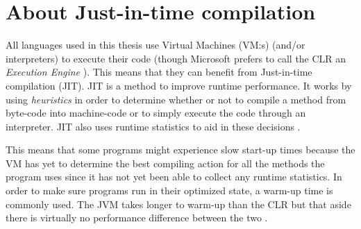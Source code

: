 \section{About Just-in-time compilation} \label{sec:jit}
All languages used in this thesis use Virtual Machines (VM:s) (and/or interpreters) to execute their code (though Microsoft prefers to call the CLR an \textit{Execution Engine} \cite{ExecutionEngine}). This means that they can benefit from Just-in-time compilation (JIT). JIT is a method to improve runtime performance. It works by using \textit{heuristics} in order to determine whether or not to compile a method from byte-code into machine-code or to simply execute the code through an interpreter. JIT also uses runtime statistics to aid in these decisions \cite{Jit}.

This means that some programs might experience slow start-up times because the VM has yet to determine the best compiling action for all the methods the program uses since it has not yet been able to collect any runtime statistics. In order to make sure programs run in their optimized state, a warm-up time is commonly used. The JVM takes longer to warm-up than the CLR but that aside there is virtually no performance difference between the two \cite{SingerJit}.
